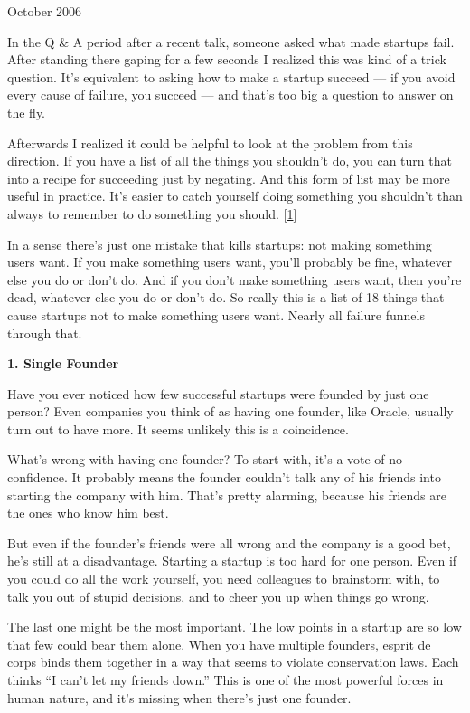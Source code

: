 October 2006

In the Q \& A period after a recent talk, someone asked what made
startups fail. After standing there gaping for a few seconds I realized
this was kind of a trick question. It's equivalent to asking how to make
a startup succeed --- if you avoid every cause of failure, you succeed
--- and that's too big a question to answer on the fly.

Afterwards I realized it could be helpful to look at the problem from
this direction. If you have a list of all the things you shouldn't do,
you can turn that into a recipe for succeeding just by negating. And
this form of list may be more useful in practice. It's easier to catch
yourself doing something you shouldn't than always to remember to do
something you should. {[}\hyperref[f1n]{1}{]}

In a sense there's just one mistake that kills startups: not making
something users want. If you make something users want, you'll probably
be fine, whatever else you do or don't do. And if you don't make
something users want, then you're dead, whatever else you do or don't
do. So really this is a list of 18 things that cause startups not to
make something users want. Nearly all failure funnels through that.

\textbf{1. Single Founder}

Have you ever noticed how few successful startups were founded by just
one person? Even companies you think of as having one founder, like
Oracle, usually turn out to have more. It seems unlikely this is a
coincidence.

What's wrong with having one founder? To start with, it's a vote of no
confidence. It probably means the founder couldn't talk any of his
friends into starting the company with him. That's pretty alarming,
because his friends are the ones who know him best.

But even if the founder's friends were all wrong and the company is a
good bet, he's still at a disadvantage. Starting a startup is too hard
for one person. Even if you could do all the work yourself, you need
colleagues to brainstorm with, to talk you out of stupid decisions, and
to cheer you up when things go wrong.

The last one might be the most important. The low points in a startup
are so low that few could bear them alone. When you have multiple
founders, esprit de corps binds them together in a way that seems to
violate conservation laws. Each thinks ``I can't let my friends down.''
This is one of the most powerful forces in human nature, and it's
missing when there's just one founder.

